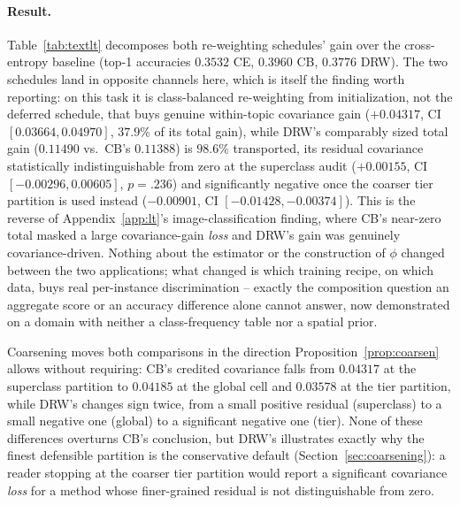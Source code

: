 \paragraph{Result.} Table~\ref{tab:textlt} decomposes both re-weighting schedules' gain
over the cross-entropy baseline (top-1 accuracies $0.3532$ CE, $0.3960$ CB, $0.3776$
DRW). The two schedules land in opposite channels here, which is itself the finding
worth reporting: on this task it is class-balanced re-weighting from initialization, not
the deferred schedule, that buys genuine within-topic covariance gain ($+0.04317$, CI
$[0.03664,0.04970]$, $37.9\%$ of its total gain), while DRW's comparably sized total gain
($0.11490$ vs.\ CB's $0.11388$) is $98.6\%$ transported, its residual covariance
statistically indistinguishable from zero at the superclass audit ($+0.00155$, CI
$[-0.00296,0.00605]$, $p=.236$) and significantly negative once the coarser tier
partition is used instead ($-0.00901$, CI $[-0.01428,-0.00374]$). This is the reverse of
Appendix~\ref{app:lt}'s image-classification finding, where CB's near-zero total
masked a large covariance-gain \emph{loss} and DRW's gain was genuinely covariance-driven.
Nothing about the estimator or the construction of $\phi$ changed between the two
applications; what changed is which training recipe, on which data, buys real
per-instance discrimination -- exactly the composition question an aggregate score or an
accuracy difference alone cannot answer, now demonstrated on a domain with neither a
class-frequency table nor a spatial prior.

Coarsening moves both comparisons in the direction Proposition~\ref{prop:coarsen} allows
without requiring: CB's credited covariance falls from $0.04317$ at the superclass
partition to $0.04185$ at the global cell and $0.03578$ at the tier partition, while
DRW's changes sign twice, from a small positive residual (superclass) to a small
negative one (global) to a significant negative one (tier). None of these differences
overturns CB's conclusion, but DRW's illustrates exactly why the finest defensible
partition is the conservative default (Section~\ref{sec:coarsening}): a reader stopping
at the coarser tier partition would report a significant covariance \emph{loss} for a
method whose finer-grained residual is not distinguishable from zero.

